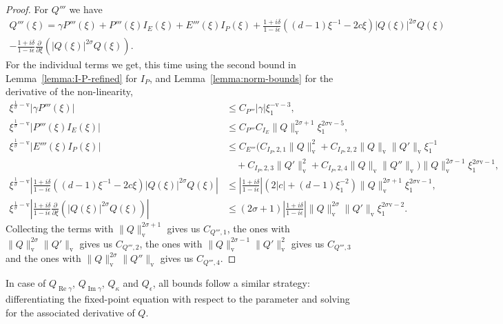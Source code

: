 \documentclass[11pt]{article}
\DeclareMathOperator{\real}{Re}
\DeclareMathOperator{\imag}{Im}
\newcommand{\normv}{\mathrm{v}}
\begin{document}
\begin{proof}
  For \(Q'''\) we have
  \begin{multline*}
    Q'''(\xi) = \gamma P'''(\xi)
    + P'''(\xi)I_{E}(\xi)
    + E'''(\xi)I_{P}(\xi)
    + \frac{1 + i\delta}{1 - i\epsilon}((d - 1)\xi^{-1} - 2c\xi)|Q(\xi)|^{2\sigma}Q(\xi)\\
    - \frac{1 + i\delta}{1 - i\epsilon}\frac{\partial}{\partial \xi}\left(|Q(\xi)|^{2\sigma}Q(\xi)\right).
  \end{multline*}
  For the individual terms we get, this time using the second bound in
  Lemma~\ref{lemma:I-P-refined} for \(I_{P}\), and
  Lemma~\ref{lemma:norm-bounds} for the derivative of the
  non-linearity,
  \begin{align*}
    \xi^{\frac{1}{\sigma} - \normv}|\gamma P'''(\xi)|
    &\leq C_{P'''}|\gamma|\xi_{1}^{-\normv - 3},\\
    \xi^{\frac{1}{\sigma} -\normv}|P'''(\xi)I_{E}(\xi)|
    &\leq C_{P'''}C_{I_{E}}\|Q\|_{\normv}^{2\sigma + 1}\xi_{1}^{2\sigma\normv - 5},\\
    \xi^{\frac{1}{\sigma} - \normv}|E'''(\xi)I_{P}(\xi)|
    &\leq C_{E'''}
      (
      C_{I_{P},2,1}\|Q\|_{\normv}^{2}
      + C_{I_{P},2,2}\|Q\|_{\normv}\|Q'\|_{\normv}\xi_{1}^{-1}\\
    &\quad+ C_{I_{P},2,3}\|Q'\|_{\normv}^{2}
      + C_{I_{P},2,4}\|Q\|_{\normv}\|Q''\|_{\normv}
      )\|Q\|_{\normv}^{2\sigma - 1}\xi_{1}^{2\sigma\normv - 1},\\
    \xi^{\frac{1}{\sigma} - \normv}\left|\frac{1 + i\delta}{1 - i\epsilon}((d - 1)\xi^{-1} - 2c\xi)|Q(\xi)|^{2\sigma}Q(\xi)\right|
    &\leq \left|\frac{1 + i\delta}{1 - i\epsilon}\right|
      (2|c| + (d - 1)\xi_{1}^{-2})\|Q\|_{\normv}^{2\sigma + 1}\xi_{1}^{2\sigma\normv - 1},\\
    \xi^{\frac{1}{\sigma} - \normv}\left|\frac{1 + i\delta}{1 - i\epsilon}\frac{\partial}{\partial \xi}\left(|Q(\xi)|^{2\sigma}Q(\xi)\right)\right|
    &\leq (2\sigma + 1)\left|\frac{1 + i\delta}{1 - i\epsilon}\right|\|Q\|_{\normv}^{2\sigma}\|Q'\|_{\normv}\xi_{1}^{2\sigma\normv - 2}.
  \end{align*}
  Collecting the terms with \(\|Q\|_\normv^{2\sigma + 1}\) gives us
  \(C_{Q''',1}\), the ones with
  \(\|Q\|_\normv^{2\sigma}\|Q'\|_\normv\) gives us \(C_{Q''',2}\), the
  ones with \(\|Q\|_\normv^{2\sigma - 1}\|Q'\|_\normv^2\) gives us
  \(C_{Q''',3}\) and the ones with
  \(\|Q\|_\normv^{2\sigma}\|Q''\|_\normv\) gives us \(C_{Q''',4}\).
\end{proof}

In case of \(Q_{\real\gamma}\), \(Q_{\imag\gamma}\), \(Q_{\kappa}\)
and \(Q_{\epsilon}\), all bounds follow a similar strategy:
differentiating the fixed-point equation with respect to the parameter
and solving for the associated derivative of \(Q\).
\end{document}
